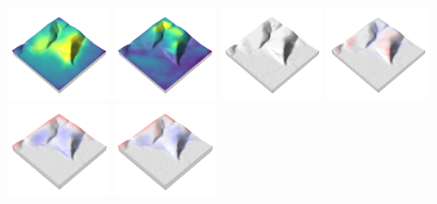 \documentclass[prodmode,acmtochi]{acmsmall} %
\begin{document}
\begin{figure}[h!]
\begin{center}
		\includegraphics[width=0.24\textwidth]{images/render_3d/stdev_dem_2.png}
		\includegraphics[width=0.24\textwidth]{images/render_3d/stdev_dem_3.png}
		\includegraphics[width=0.24\textwidth]{images/render_3d/dem_difference_1.png}
		\includegraphics[width=0.24\textwidth]{images/render_3d/mean_dem_regression_difference_1.png}
		\includegraphics[width=0.24\textwidth]{images/render_3d/mean_dem_regression_difference_2.png}
		\includegraphics[width=0.24\textwidth]{images/render_3d/mean_dem_regression_difference_3.png}

\end{center}
\end{figure}
\end{document}
